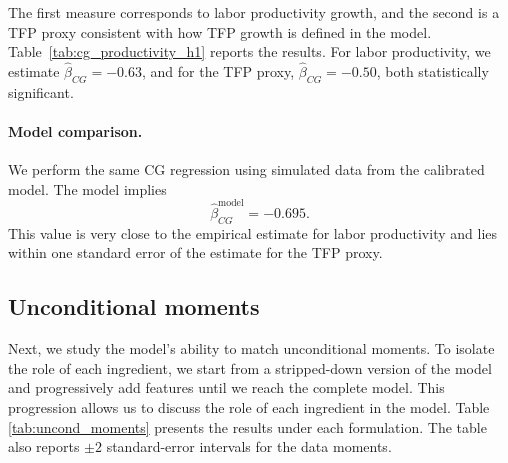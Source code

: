 {The first measure corresponds to labor productivity growth, and the second is a TFP proxy consistent with how TFP growth is defined in the model.
Table~\ref{tab:cg_productivity_h1} reports the results.
For labor productivity, we estimate
$\hat{\beta}_{CG} = -0.63$,
and for the TFP proxy,
$\hat{\beta}_{CG} = -0.50$,
both statistically significant.

\paragraph{Model comparison.}

We perform the same CG regression using simulated data from the calibrated model.
The model implies
\[
\hat{\beta}_{CG}^{\text{model}} = -0.695.
\]
This value is very close to the empirical estimate for labor productivity
and lies within one standard error of the estimate for the TFP proxy.
}

    

\subsection{Unconditional moments}\label{sec:unconditional_moments.sec}

Next, we study the model's ability to match unconditional moments. 
To isolate the role of each ingredient, we start from a stripped-down version of the model and progressively add features until we reach the complete model. 
This progression allows us to discuss the role of each ingredient in the model. Table \ref{tab:uncond_moments} presents the results under each formulation.
The table also reports $\pm 2$ standard-error intervals for the data moments.

